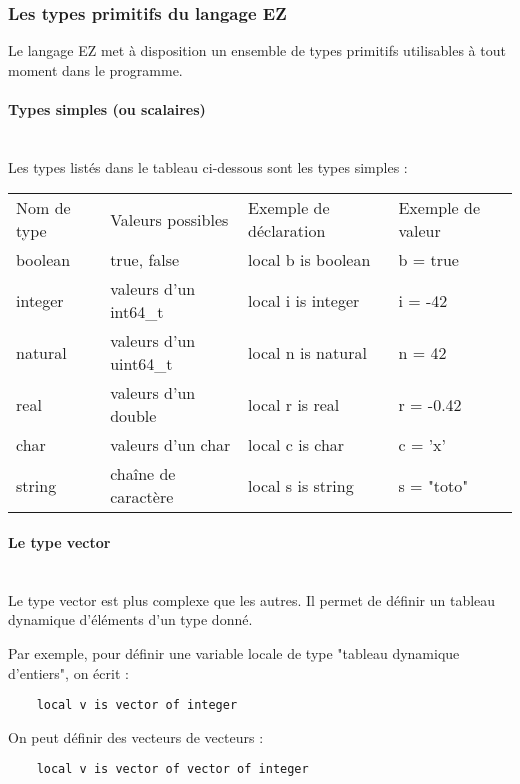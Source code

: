 \subsubsection{Les types primitifs du langage EZ}
Le langage EZ met à disposition un ensemble de types primitifs utilisables
à tout moment dans le programme.

\paragraph{Types simples (ou scalaires)}\mbox{} \\
Les types listés dans le tableau ci-dessous sont les types simples : \\
\begin{tabular}{ l | l | l | l }
    Nom de type     & Valeurs possibles      & Exemple de déclaration & Exemple de valeur \\
    boolean         & true, false            & local b is boolean     & b = true          \\
    integer         & valeurs d'un int64\_t  & local i is integer     & i = -42           \\
    natural         & valeurs d'un uint64\_t & local n is natural     & n = 42            \\
    real            & valeurs d'un double    & local r is real        & r = -0.42         \\
    char            & valeurs d'un char      & local c is char        & c = 'x'           \\
    string          & chaîne de caractère    & local s is string      & s = "toto"        \\
\end{tabular}

\paragraph{Le type vector}\mbox{} \\

Le type vector est plus complexe que les autres. Il permet de définir un tableau
dynamique d'éléments d'un type donné.

Par exemple, pour définir une variable locale de type "tableau dynamique d'entiers",
on écrit :
\begin{verbatim}
    local v is vector of integer
\end{verbatim}

On peut définir des vecteurs de vecteurs :
\begin{verbatim}
    local v is vector of vector of integer
\end{verbatim}


